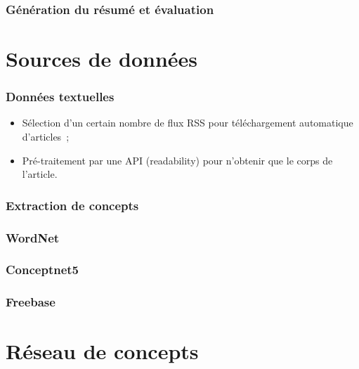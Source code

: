 \documentclass[12pt, handout]{beamer}
\begin{document}
\begin{frame}
 \frametitle{Génération du résumé et évaluation}
 
\end{frame}


\section{Sources de données}


\begin{frame}
 \frametitle{Données textuelles}
 \begin{itemize}
  \item Sélection d'un certain nombre de flux RSS pour téléchargement automatique d'articles~;
  \item Pré-traitement par une API (readability) pour n'obtenir que le corps de l'article.
 \end{itemize}
 
\end{frame}


\begin{frame}
 \frametitle{Extraction de concepts}
 
 
\end{frame}

\begin{frame}
 \frametitle{WordNet}
 
 
\end{frame}

\begin{frame}
 \frametitle{Conceptnet5}
 
 
\end{frame}

\begin{frame}
 \frametitle{Freebase}
 
 
\end{frame}


\section{Réseau de concepts}
\end{document}
